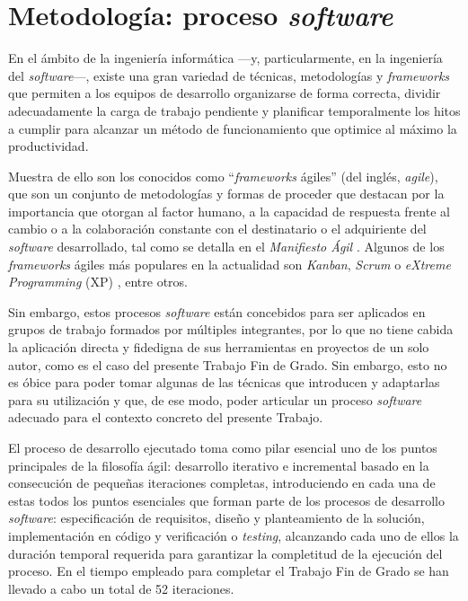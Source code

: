 \section{Metodología: proceso \textit{software}}
\label{sec:metodologia}

En el ámbito de la ingeniería informática ---y, particularmente, en la ingeniería del \textit{software}---, existe una gran variedad de técnicas, metodologías y \textit{frameworks} que permiten a los equipos de desarrollo organizarse de forma correcta, dividir adecuadamente la carga de trabajo pendiente y planificar temporalmente los hitos a cumplir para alcanzar un método de funcionamiento que optimice al máximo la productividad.

Muestra de ello son los conocidos como ``\textit{frameworks} ágiles'' (del inglés, \textit{agile}), que son un conjunto de metodologías y formas de proceder que destacan por la importancia que otorgan al factor humano, a la capacidad de respuesta frente al cambio o a la colaboración constante con el destinatario o el adquiriente del \textit{software} desarrollado, tal como se detalla en el \textit{Manifiesto Ágil} \cite{Met_AgileManifesto}. Algunos de los \textit{frameworks} ágiles más populares en la actualidad son \textit{Kanban}, \textit{Scrum} o \textit{eXtreme Programming} (XP) \cite{Met_AgileFrameworks}, entre otros.

Sin embargo, estos procesos \textit{software} están concebidos para ser aplicados en grupos de trabajo formados por múltiples integrantes, por lo que no tiene cabida la aplicación directa y fidedigna de sus herramientas en proyectos de un solo autor, como es el caso del presente Trabajo Fin de Grado. Sin embargo, esto no es óbice para poder tomar algunas de las técnicas que introducen y adaptarlas para su utilización y que, de ese modo, poder articular un proceso \textit{software} adecuado para el contexto concreto del presente Trabajo.

El proceso de desarrollo ejecutado toma como pilar esencial uno de los puntos principales de la filosofía ágil: desarrollo iterativo e incremental basado en la consecución de pequeñas iteraciones completas, introduciendo en cada una de estas todos los puntos esenciales que forman parte de los procesos de desarrollo \textit{software}: especificación de  requisitos, diseño y planteamiento de la solución, implementación en código y verificación o \textit{testing}, alcanzando cada uno de ellos la duración temporal requerida para garantizar la completitud de la ejecución del proceso. En el tiempo empleado para completar el Trabajo Fin de Grado se han llevado a cabo un total de 52 iteraciones.

